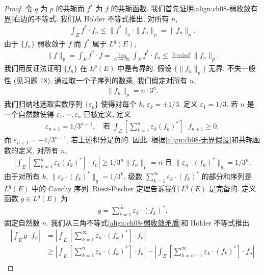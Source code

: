 \documentclass[../../main.tex]{subfiles}
\begin{document}
\begin{proof}
令 $q$ 为 $p$ 的共轭而 $f^{*}$ 为 $f$ 的共轭函数. 我们首先证明\eqref{align:ch08-弱收敛有界}右边的不等式. 我们从 H\"older 不等式推出, 对所有 $n$,
\begin{align*}
\int_{E}f^{*}\cdot f_{n}\leqslant\|f^{*}\|_{q}\cdot\|f_{n}\|_{p}=\|f_{n}\|_{p}.
\end{align*}
由于 $\{f_{n}\}$ 弱收敛于 $f$ 而 $f^{*}$ 属于 $L^{q}(E)$,
\begin{align*}
\|f\|_{p}=\int_{E}f^{*}\cdot f=\lim_{n\to\infty}\int_{E}f^{*}\cdot f_{n}\leqslant\liminf\|f_{n}\|_{p}.
\end{align*}
我们用反证法证明 $\{f_{n}\}$ 在 $L^{p}(E)$ 中是有界的. 假设 $\{\|f_{n}\|_{p}\}$ 无界. 不失一般性 (见习题 18), 通过取一个子序列的数乘, 我们假定对所有 $n$,
\begin{align}
\|f_{n}\|_{p}=n\cdot 3^{n}.\label{align:ch08-无界假设}
\end{align}
我们归纳地选取实数序列 $\{\varepsilon_{k}\}$ 使得对每个 $k$, $\varepsilon_{k}=\pm 1/3$. 定义 $\varepsilon_{1}=1/3$. 若 $n$ 是一个自然数使得 $\varepsilon_{1},\cdots,\varepsilon_{n}$ 已被定义, 定义
\begin{align*}
\varepsilon_{n+1}=1/3^{n+1},\quad\text{若 }\int_{E}\left[\sum_{k=1}^{n}\varepsilon_{k}(f_{k})^{*}\right]\cdot f_{n+1}\geqslant 0,
\end{align*}
而 $\varepsilon_{n+1}=-1/3^{n+1}$, 若上述积分是负的. 因此, 根据\eqref{align:ch08-无界假设}和共轭函数的定义, 对所有 $n$,
\begin{align}
\left|\int_{E}\left[\sum_{k=1}^{n}\varepsilon_{k}(f_{k})^{*}\right]\cdot f_{n}\right|\geqslant 1/3^{n}\|f_{n}\|_{p}=n\text{ 且 }\|\varepsilon_{n}\cdot(f_{n})^{*}\|_{q}=1/3^{n}.\label{align:ch08-弱收敛矛盾}
\end{align}
由于对所有 $k$, $\|\varepsilon_{k}\cdot(f_{k})^{*}\|_{q}=1/3^{k}$, 级数 $\sum_{k=1}^{\infty}\varepsilon_{k}\cdot(f_{k})^{*}$ 的部分和序列是 $L^{q}(E)$ 中的 Cauchy 序列. Riesz-Fischer 定理告诉我们 $L^{q}(E)$ 是完备的. 定义函数 $g\in L^{q}(E)$ 为
\begin{align*}
g=\sum_{k=1}^{\infty}\varepsilon_{k}\cdot(f_{k})^{*}.
\end{align*}
固定自然数 $n$. 我们从三角不等式\eqref{align:ch08-弱收敛矛盾}和 H\"older 不等式推出
\begin{align*}
\left|\int_{E}g\cdot f_{n}\right|&=\left|\int_{E}\left[\sum_{k=1}^{\infty}\varepsilon_{k}\cdot(f_{k})^{*}\right]\cdot f_{n}\right|\\
&\geqslant\left|\int_{E}\left[\sum_{k=1}^{n}\varepsilon_{k}\cdot(f_{k})^{*}\right]\cdot f_{n}\right|-\left|\int_{E}\left[\sum_{k=n+1}^{\infty}\varepsilon_{k}\cdot(f_{k})^{*}\right]\cdot f_{n}\right|\\

\end{align*}
\end{proof}
\end{document}

